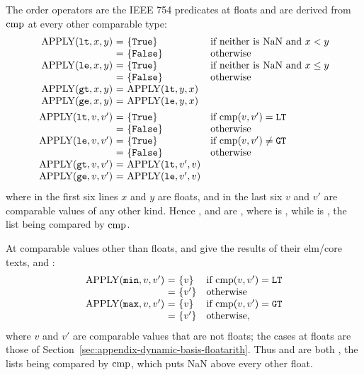 The order operators are the IEEE 754 predicates at floats and are derived
from $\mathrm{cmp}$ at every other comparable type: %
\[
  \begin{array}{@{}r@{\ }c@{\ }l@{\quad}l@{}}
  \APPLY(\kw{lt},x,y) & = & \{\kw{True}\} & \text{if neither is NaN and}\ x<y\\
                      & = & \{\kw{False}\} & \text{otherwise}\\
  \APPLY(\kw{le},x,y) & = & \{\kw{True}\} & \text{if neither is NaN and}\ x\leq y\\
                      & = & \{\kw{False}\} & \text{otherwise}\\
  \APPLY(\kw{gt},x,y) & = & \APPLY(\kw{lt},y,x) & \\
  \APPLY(\kw{ge},x,y) & = & \APPLY(\kw{le},y,x) & \\[1ex]
  \APPLY(\kw{lt},v,v') & = & \{\kw{True}\} & \text{if}\ \dbcmp(v,v')=\kw{LT}\\
                       & = & \{\kw{False}\} & \text{otherwise}\\
  \APPLY(\kw{le},v,v') & = & \{\kw{True}\} & \text{if}\ \dbcmp(v,v')\neq\kw{GT}\\
                       & = & \{\kw{False}\} & \text{otherwise}\\
  \APPLY(\kw{gt},v,v') & = & \APPLY(\kw{lt},v',v) & \\
  \APPLY(\kw{ge},v,v') & = & \APPLY(\kw{le},v',v) &
  \end{array}
\]
where in the first six lines $x$ and $y$ are floats, and in the last six $v$ and
$v'$ are comparable values of any other kind. Hence ,
 and  are , where  is
, while \kw{[ nan ] > [ 1 ]} is , the list being compared by
$\mathrm{cmp}$. %

At comparable values other than floats,  and  give the
results of their elm/core texts,  and
: %
\[
  \begin{array}{@{}r@{\ }c@{\ }l@{\quad}l@{}}
  \APPLY(\kw{min},v,v') & = & \{v\} & \text{if}\ \dbcmp(v,v')=\kw{LT}\\
                        & = & \{v'\} & \text{otherwise}\\
  \APPLY(\kw{max},v,v') & = & \{v\} & \text{if}\ \dbcmp(v,v')=\kw{GT}\\
                        & = & \{v'\} & \text{otherwise},
  \end{array}
\]
where $v$ and $v'$ are comparable values that are not floats; the cases at
floats are those of Section~\ref{sec:appendix-dynamic-basis-floatarith}.
Thus  and  are both
\kw{[ nan ]}, the lists being compared by $\mathrm{cmp}$, which puts NaN above
every other float. %

